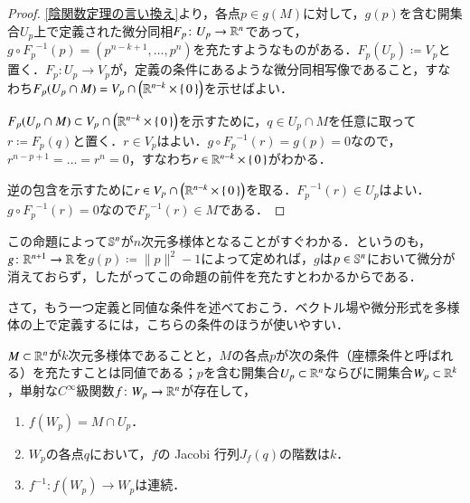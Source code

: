 \begin{proof}
\cref{陰関数定理の言い換え}より，各点$p \in g(M)$に対して，$g(p)$を含む開集合$U_p$上で定義された微分同相$F_p \colon U_p \to \mathbb{R}^n$であって，$g \circ {F_p}^{-1} (p) = (p^{n-k+1}, \dots, p^n)$を充たすようなものがある．$F_p(U_p) \coloneqq V_p$と置く．$F_p \colon U_p \to V_p$が，定義の条件にあるような微分同相写像であること，すなわち$F_p(U_p \cap M) = V_p \cap \left( \mathbb{R}^{n-k} \times \set{0} \right)$を示せばよい．

$F_p(U_p \cap M) \subset V_p \cap \left( \mathbb{R}^{n-k} \times \set{0} \right)$を示すために，$q \in U_p \cap M$を任意に取って$r \coloneqq F_p(q)$と置く．$r \in V_p$はよい．$g \circ {F_p}^{-1}(r) = g(p) = 0$なので，$r^{n-p+1} = \dots = r^n = 0$，すなわち$r \in \mathbb{R}^{n-k} \times \set{0}$がわかる．

逆の包含を示すために$r \in V_p \cap \left( \mathbb{R}^{n-k} \times \set{0} \right)$を取る．${F_p}^{-1}(r) \in U_p$はよい．$g \circ {F_p}^{-1}(r)=0$なので${F_p}^{-1}(r) \in M$である．
\end{proof}

この命題によって$\mathbb{S}^n$が$n$次元多様体となることがすぐわかる．というのも，$g \colon \mathbb{R}^{n+1} \to \mathbb{R}$を$g(p) \coloneqq \|p\|^2 - 1$によって定めれば，$g$は$p \in \mathbb{S}^n$において微分が消えておらず，したがってこの命題の前件を充たすとわかるからである．

さて，もう一つ定義と同値な条件を述べておこう．ベクトル場や微分形式を多様体の上で定義するには，こちらの条件のほうが使いやすい．

\begin{thm}
$M \subset \mathbb{R}^n$が$k$次元多様体であることと，$M$の各点$p$が次の条件（座標条件と呼ばれる）を充たすことは同値である；$p$を含む開集合$U_p \subset \mathbb{R}^n$ならびに開集合$W_p \subset \mathbb{R}^k$，単射な$C^\infty$級関数$f \colon W_p \to \mathbb{R}^n$が存在して，
\begin{enumerate}
\item $f(W_p) = M \cap U_p$．
\item $W_p$の各点$q$において，$f$の Jacobi 行列$J_f(q)$の階数は$k$．
\item $f^{-1} \colon f(W_p) \to W_p$は連続．
\end{enumerate}
\end{thm}

